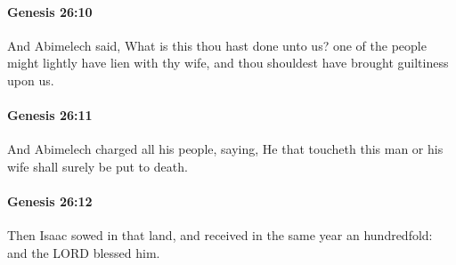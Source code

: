 		\paragraph{Genesis 26:10} %
			\label{GENESIS-26-10}

			And Abimelech said, What is this thou hast done unto us?  one of the people might lightly have lien with thy wife, and thou shouldest have brought guiltiness upon us.


		\paragraph{Genesis 26:11} %
			\label{GENESIS-26-11}

			And Abimelech charged all his people, saying, He that toucheth this man or his wife shall surely be put to death.


		\paragraph{Genesis 26:12} %
			\label{GENESIS-26-12}

			Then Isaac sowed in that land, and received in the same year an hundredfold: and the LORD blessed him.


